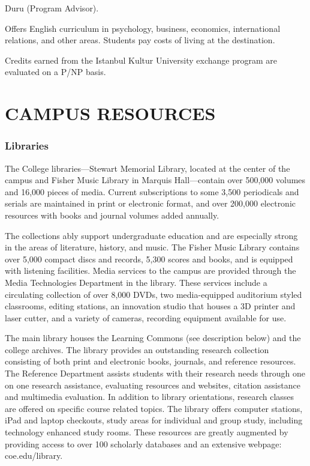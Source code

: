 \documentclass[
  letterpaper,
]{scrbook}
\renewcommand{\part}[1]{\addcontentsline{toc}{part}{#1}}
\begin{document}
Duru (Program Advisor).

Offers English curriculum in psychology, business, economics,
international relations, and other areas. Students pay costs of living
at the destination.

Credits earned from the Istanbul Kultur University exchange program are
evaluated on a P/NP basis.

\part{CAMPUS RESOURCES}

\chapter{CAMPUS RESOURCES}\label{campus-resources-1}

\subsection{Libraries}\label{libraries}

The College libraries---Stewart Memorial Library, located at the center
of the campus and Fisher Music Library in Marquis Hall---contain over
500,000 volumes and 16,000 pieces of media. Current subscriptions to
some 3,500 periodicals and serials are maintained in print or electronic
format, and over 200,000 electronic resources with books and journal
volumes added annually.

The collections ably support undergraduate education and are especially
strong in the areas of literature, history, and music. The Fisher Music
Library contains over 5,000 compact discs and records, 5,300 scores and
books, and is equipped with listening facilities. Media services to the
campus are provided through the Media Technologies Department in the
library. These services include a circulating collection of over 8,000
DVDs, two media-equipped auditorium styled classrooms, editing stations,
an innovation studio that houses a 3D printer and laser cutter, and a
variety of cameras, recording equipment available for use.

The main library houses the Learning Commons (see description below) and
the college archives. The library provides an outstanding research
collection consisting of both print and electronic books, journals, and
reference resources. The Reference Department assists students with
their research needs through one on one research assistance, evaluating
resources and websites, citation assistance and multimedia evaluation.
In addition to library orientations, research classes are offered on
specific course related topics. The library offers computer stations,
iPad and laptop checkouts, study areas for individual and group study,
including technology enhanced study rooms. These resources are greatly
augmented by providing access to over 100 scholarly databases and an
extensive webpage: coe.edu/library.
\end{document}
